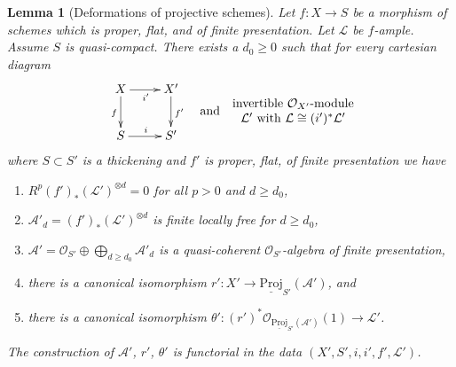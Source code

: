\documentclass{amsart}
\theoremstyle{plain}
\newtheorem{lemma}[subsection]{Lemma}
\theoremstyle{definition}
\theoremstyle{remark}
\numberwithin{equation}{subsection}
\begin{document}
\begin{lemma}[Deformations of projective schemes]
\label{lemma-deform-projective}
Let $f : X \to S$ be a morphism of schemes which is proper, flat, and
of finite presentation. Let $\mathcal{L}$ be $f$-ample. Assume
$S$ is quasi-compact. There exists a $d_0 \geq 0$ such that
for every cartesian diagram
$$
\vcenter{
\xymatrix{
X \ar[r]_{i'} \ar[d]_f & X' \ar[d]^{f'} \\
S \ar[r]^i & S'
}
}
\quad\text{and}\quad
\begin{matrix}
\text{invertible }\mathcal{O}_{X'}\text{-module}\\
\mathcal{L}'\text{ with }\mathcal{L} \cong (i')^*\mathcal{L}'
\end{matrix}
$$
where $S \subset S'$ is a thickening and $f'$ is
proper, flat, of finite presentation we have
\begin{enumerate}
\item $R^p(f')_*(\mathcal{L}')^{\otimes d} = 0$
for all $p > 0$ and $d \geq d_0$,
\item $\mathcal{A}'_d = (f')_*(\mathcal{L}')^{\otimes d}$
is finite locally free for $d \geq d_0$,
\item $\mathcal{A}' =
\mathcal{O}_{S'} \oplus \bigoplus_{d \geq d_0} \mathcal{A}'_d$
is a quasi-coherent $\mathcal{O}_{S'}$-algebra of finite presentation,
\item there is a canonical isomorphism
$r' : X' \to \underline{\text{Proj}}_{S'}(\mathcal{A}')$, and
\item there is a canonical isomorphism
$\theta' : (r')^*\mathcal{O}_{\underline{\text{Proj}}_{S'}(\mathcal{A}')}(1)
\to \mathcal{L}'$.
\end{enumerate}
The construction of $\mathcal{A}'$, $r'$, $\theta'$
is functorial in the data $(X', S', i, i', f', \mathcal{L}')$.
\end{lemma}
\end{document}
